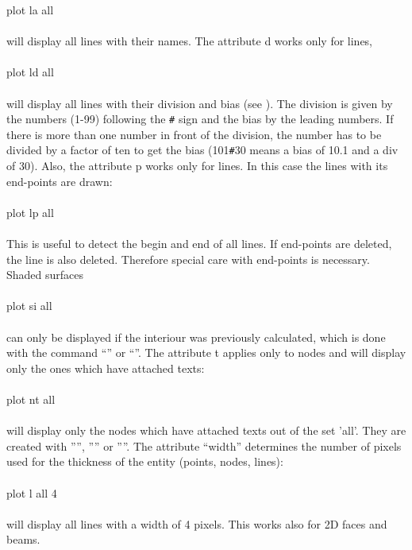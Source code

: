 \documentclass{article}
\begin{document}
plot la all\\\\will display all lines with their names. The attribute d works only for lines,\\\\plot ld all\\\\ will display all lines with their division and bias (see ). The division is given by the numbers (1-99) following the \verb_#_ sign and the bias by the leading numbers. If there is more than one number in front of the division, the number has to be divided by a factor of ten to get the bias (101\verb_#_30 means a bias of 10.1 and a div of 30). Also, the attribute p works only for lines. In this case the lines with its end-points are drawn:\\\\plot lp all\\\\This is useful to detect the begin and end of all lines. If end-points are deleted, the line is also deleted. Therefore special care with end-points is necessary. Shaded surfaces\\\\plot si all\\\\ can only be displayed if the interiour was previously calculated, which is done with the command ``'' or ``''. The attribute t applies only to nodes and will display only the ones which have attached texts:\\\\plot nt all\\\\will display only the nodes which have attached texts out of the set 'all'. They are created with '''', '''' or ''''. The attribute ``width'' determines the number of pixels used for the thickness of the entity (points, nodes, lines):\\\\plot l all 4\\\\will display all lines with a width of 4 pixels. This works also for 2D faces and beams.
\end{document}
